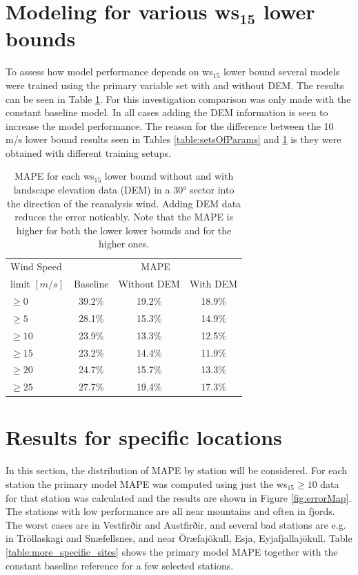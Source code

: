 \section{Modeling for various ws$_\textbf{15}$ lower bounds}
To assess how model performance depends on ws$_{15}$ lower bound several models were trained using the primary variable set with and without DEM. The results can be seen in Table \ref{table:results}. For this investigation comparison was only made with the constant baseline model. In all cases adding the DEM information is seen to increase the model performance. The reason for the difference between the 10 m/s lower bound results seen in Tables \ref{table:setsOfParams} and \ref{table:results} is they were obtained with different training setups. 

\begin{table}[h]
  \caption[Model results for different wind speed limits]{MAPE for each ws$_{15}$ lower bound without and with landscape elevation data (DEM) in a 30° sector into the direction of the reanalysis wind. Adding DEM data reduces the error noticably. Note that the MAPE is higher for both the lower lower bounds and for the higher ones.}
    \label{table:results}
    \centering
    \begin{tabular}{lccc}
        \toprule
        Wind Speed & \multicolumn{3}{c}{MAPE} \\
        limit $[m/s]$ & Baseline & Without DEM & With DEM \\
        \midrule
        $\geq 0$ & 39.2\% & 19.2\% & 18.9\% \\
        $\geq 5$ & 28.1\% & 15.3\% & 14.9\%\\
        $\geq 10$ & 23.9\% & 13.3\% & 12.5\%\\
        $\geq 15$ & 23.2\% & 14.4\% & 11.9\%\\
        $\geq 20$ & 24.7\% & 15.7\% & 13.3\%\\
        $\geq 25$ & 27.7\% & 19.4\% & 17.3\%\\
        \bottomrule
    \end{tabular}
  \end{table}

\section{Results for specific locations}
In this section, the distribution of MAPE by station will be considered. For each station the primary model MAPE was computed using just the ws$_{15} \geq 10$ data for that station was calculated and the results are shown in Figure \ref{fig:errorMap}. The stations with low performance are all near mountains and often in fjords. The worst cases are in Vestfirðir and Austfirðir, and several bad stations are e.g. in Tröllaskagi and Snæfellsnes, and near Öræfajökull, Esja, Eyjafjallajökull. Table \ref{table:more_specific_sites} shows the primary model MAPE together with the constant baseline reference for a few selected stations.

